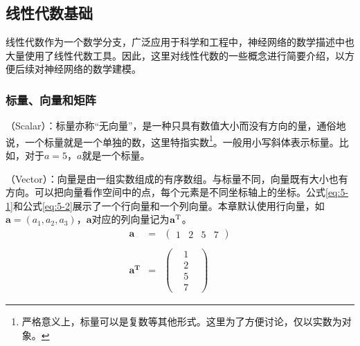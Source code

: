\subsection{线性代数基础} \label{sec:5.2.1}

\parinterval 线性代数作为一个数学分支，广泛应用于科学和工程中，神经网络的数学描述中也大量使用了线性代数工具。因此，这里对线性代数的一些概念进行简要介绍，以方便后续对神经网络的数学建模。


\subsubsection{标量、向量和矩阵}

\vspace{-0.5em}
（Scalar）：标量亦称``无向量''，是一种只具有数值大小而没有方向的量，通俗地说，一个标量就是一个单独的数，这里特指实数\footnote{严格意义上，标量可以是复数等其他形式。这里为了方便讨论，仅以实数为对象。}。一般用小写斜体表示标量。比如，对于$ a=5 $，$ a $就是一个标量。

（Vector）：向量是由一组实数组成的有序数组。与标量不同，向量既有大小也有方向。可以把向量看作空间中的点，每个元素是不同坐标轴上的坐标。公式\ref{eq:5-1}和公式\ref{eq:5-2}展示了一个行向量和一个列向量。本章默认使用行向量，如$ \mathbf a=(a_1, a_2, a_3) $，$ \mathbf a $对应的列向量记为$ \mathbf a^{\rm T} $。
\begin{eqnarray}
\mathbf a &=& \begin{pmatrix}
  1 & 2 & 5 & 7
\end{pmatrix}\label{eq:5-1}\\ \nonumber \\
\mathbf{a^{\textrm{T}}} &=& \begin{pmatrix}
    &1& \\
    &2&\\
    &5& \\
    &7&\end{pmatrix}
\label{eq:5-2}
\end{eqnarray}

